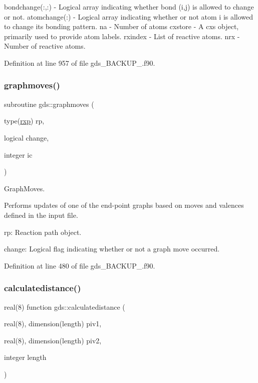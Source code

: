 bondchange(\+:,\+:) -\/ Logical array indicating whether bond (i,j) is allowed to change or not. atomchange(\+:) -\/ Logical array indicating whether or not atom i is allowed to change its bonding pattern. na -\/ Number of atoms cxstore -\/ A cxs object, primarily used to provide atom labels. rxindex -\/ List of reactive atoms. nrx -\/ Number of reactive atoms. 

Definition at line 957 of file gds\+\_\+\+B\+A\+C\+K\+U\+P\+\_.\+f90.

\mbox{\label{namespacegds_ad2b8d4cdd489645b501e20ea68ac1601}} 
\subsubsection{\texorpdfstring{graphmoves()}{graphmoves()}\hspace{0.1cm}{\footnotesize\ttfamily [2/2]}}
{\footnotesize\ttfamily subroutine gds\+::graphmoves (\begin{DoxyParamCaption}\item[{type(\mbox{\hyperlink{structrpath_1_1rxp}{rxp}})}]{rp,  }\item[{logical}]{change,  }\item[{integer}]{ic }\end{DoxyParamCaption})}



Graph\+Moves. 

Performs updates of one of the end-\/point graphs based on moves and valences defined in the input file.


\begin{DoxyItemize}
\item rp\+: Reaction path object.
\item change\+: Logical flag indicating whether or not a graph move occurred. 
\end{DoxyItemize}

Definition at line 480 of file gds\+\_\+\+B\+A\+C\+K\+U\+P\+\_.\+f90.

\mbox{\label{namespacegds_a5188bea0bc64cb9e00ab22d7a0e861b5}} 
\subsubsection{\texorpdfstring{calculatedistance()}{calculatedistance()}}
{\footnotesize\ttfamily real(8) function gds\+::calculatedistance (\begin{DoxyParamCaption}\item[{real(8), dimension(length)}]{piv1,  }\item[{real(8), dimension(length)}]{piv2,  }\item[{integer}]{length }\end{DoxyParamCaption})}



